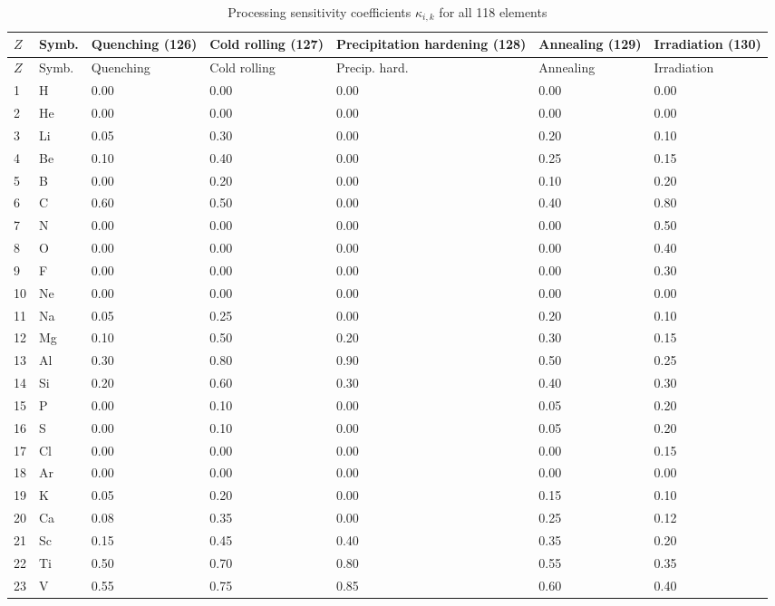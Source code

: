 \documentclass[12pt,a4paper]{article}
\begin{document}
	\begin{longtable}{p{2.2cm}p{1.2cm}p{2.2cm}p{2.2cm}p{2.2cm}p{2.2cm}p{2.2cm}}
		\caption{Processing sensitivity coefficients \(\kappa_{i,k}\) for all 118 elements} \label{tab:kappa-ik-full} \\
		\toprule
		\(Z\) & Symb. & Quenching (126) & Cold rolling (127) & Precipitation hardening (128) & Annealing (129) & Irradiation (130) \\
		\midrule
		\endfirsthead
		\toprule
		\(Z\) & Symb. & Quenching & Cold rolling & Precip. hard. & Annealing & Irradiation \\
		\midrule
		\endhead
		1  & H   & 0.00 & 0.00 & 0.00 & 0.00 & 0.00 \\
		2  & He  & 0.00 & 0.00 & 0.00 & 0.00 & 0.00 \\
		3  & Li  & 0.05 & 0.30 & 0.00 & 0.20 & 0.10 \\
		4  & Be  & 0.10 & 0.40 & 0.00 & 0.25 & 0.15 \\
		5  & B   & 0.00 & 0.20 & 0.00 & 0.10 & 0.20 \\
		6  & C   & 0.60 & 0.50 & 0.00 & 0.40 & 0.80 \\
		7  & N   & 0.00 & 0.00 & 0.00 & 0.00 & 0.50 \\
		8  & O   & 0.00 & 0.00 & 0.00 & 0.00 & 0.40 \\
		9  & F   & 0.00 & 0.00 & 0.00 & 0.00 & 0.30 \\
		10 & Ne  & 0.00 & 0.00 & 0.00 & 0.00 & 0.00 \\
		11 & Na  & 0.05 & 0.25 & 0.00 & 0.20 & 0.10 \\
		12 & Mg  & 0.10 & 0.50 & 0.20 & 0.30 & 0.15 \\
		13 & Al  & 0.30 & 0.80 & 0.90 & 0.50 & 0.25 \\
		14 & Si  & 0.20 & 0.60 & 0.30 & 0.40 & 0.30 \\
		15 & P   & 0.00 & 0.10 & 0.00 & 0.05 & 0.20 \\
		16 & S   & 0.00 & 0.10 & 0.00 & 0.05 & 0.20 \\
		17 & Cl  & 0.00 & 0.00 & 0.00 & 0.00 & 0.15 \\
		18 & Ar  & 0.00 & 0.00 & 0.00 & 0.00 & 0.00 \\
		19 & K   & 0.05 & 0.20 & 0.00 & 0.15 & 0.10 \\
		20 & Ca  & 0.08 & 0.35 & 0.00 & 0.25 & 0.12 \\
		21 & Sc  & 0.15 & 0.45 & 0.40 & 0.35 & 0.20 \\
		22 & Ti  & 0.50 & 0.70 & 0.80 & 0.55 & 0.35 \\
		23 & V   & 0.55 & 0.75 & 0.85 & 0.60 & 0.40 \\

\end{longtable}
\end{document}
